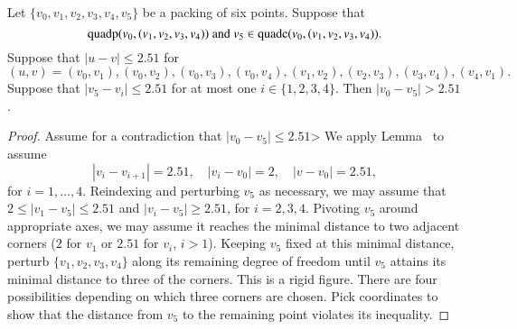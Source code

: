 \begin{tarskidata}
\begin{tarski}

\begin{lemma}
Let $\{v_0,v_1,v_2,v_3,v_4,v_5\}$ be a packing of six points.
Suppose that 
  $${\operatorname{quadp}}(v_0,(v_1,v_2,v_3,v_4)) \text{ and }
   v_5\in {\operatorname{quadc}}(v_0,(v_1,v_2,v_3,v_4)).$$
Suppose that $|u-v|\le 2.51$ for
  $$(u,v)=(v_0,v_1), (v_0,v_2), (v_0,v_3), (v_0,v_4), 
  (v_1,v_2), (v_2,v_3), (v_3,v_4), (v_4,v_1).$$
Suppose that
$|v_5-v_i|\le 2.51$ for at most one $i\in\{1,2,3,4\}$.  Then
$|v_0-v_5| > 2.51$.
\end{lemma}



\begin{proof} Assume for a contradiction that $|v_0-v_5|\le2.51$>
We apply Lemma~ to assume
    $$|v_i-v_{i+1}|=2.51,\quad |v_i-v_0|=2, \quad |v-v_0|=2.51,$$
for $i=1,\ldots,4$. Reindexing and perturbing $v_5$ as necessary, we
may assume that $2\le |v_1-v_5|\le2.51$ and $|v_i-v_5|\ge2.51$, for
$i=2,3,4$.  Pivoting $v_5$ around appropriate axes, 
we may assume it reaches the minimal
distance to two adjacent corners ($2$ for $v_1$ or $2.51$ for
$v_i$, $i>1$).  Keeping $v_5$ fixed at this minimal distance,
perturb $\{v_1,v_2,v_3,v_4\}$ along its remaining degree of freedom
until $v_5$ attains its minimal distance to three of the corners.
This is a rigid figure.  There are four possibilities depending on
which three corners are chosen. Pick coordinates to show that the
distance from $v_5$ to the remaining point violates its inequality.
\end{proof}
\end{tarski}





\begin{tarski}


\end{tarski}
\end{tarskidata}
